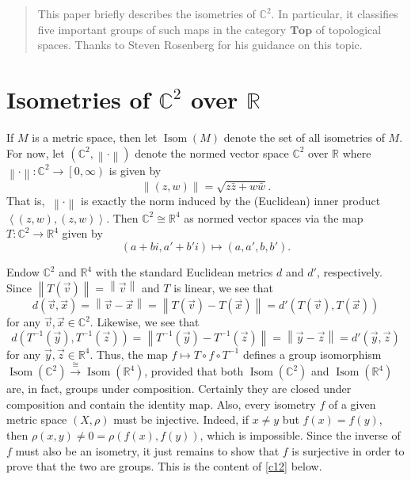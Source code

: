 \documentclass[10pt,letterpaper,cm]{nupset}
\theoremstyle{definition}
\theoremstyle{theorem}
\theoremstyle{remark}
\newcommand{\C}{\mathbb C}
\newcommand{\R}{\mathbb R}
\newcommand{\1}{\mathbf{1}}
\renewcommand{\v}{\vec v}
\newcommand{\x}{\vec x}
\newcommand{\y}{\vec y}
\newcommand{\z}{\vec z}
\newcommand{\0}{\vec {0}}
\DeclareMathOperator{\Isom}{Isom}
\begin{document}
\begin{abstract}
This paper briefly describes the isometries of $\C^2$. In particular, it classifies five important groups of such maps in the category $\mathbf{Top}$ of topological spaces. Thanks to Steven Rosenberg for his guidance on this topic.
\end{abstract}

\smallskip

\section{Isometries of $\C^2$ over $\R$}

If $M$ is a metric space, then let $\Isom(M)$ denote the set of all isometries of $M$. For now, let $\left(\C^2,  \left\lVert{\cdot}\right\rVert\right)$ denote the normed vector space $\C^2$ over $\R$ where $ \left\lVert{\cdot}\right\rVert : \C^2\to \left[0,\infty\right)$ is given by  $$ \left\lVert{(z,w)}\right\rVert=\sqrt{z\bar{z}+w\bar{w}}.$$ That is, $\ \left\lVert{\cdot}\right\rVert$ is exactly the norm induced by the (Euclidean) inner product $\left\langle (z,w), (z,w) \right\rangle$. Then $\C^2\cong \R^4$ as normed vector spaces via the map $T: \C^2 \to \R^4$ given by 
\[ \label{eqn:T}
\left(a+bi, a'+b'i\right)\mapsto \left(a,a',b,b'\right)
\tag{$\ast$}.\] 


	Endow $\C^2$ and $\R^4$ with the standard Euclidean metrics $d$ and $d'$, respectively. Since $ \left\lVert{T(\v)}\right\rVert= \left\lVert{\v}\right\rVert$ and $T$ is linear, we see that $$d(\v, \x)= \left\lVert{\v-\x}\right\rVert= \left\lVert{T(\v) -T(\x)}\right\rVert=d'(T(\v), T(\x))$$ for any $\v, \x \in \C^2.$ Likewise, we see that $$d(T^{-1}(\y), T^{-1}(\z))= \left\lVert{T^{-1}(\y)-T^{-1}(\z)}\right\rVert= \left\lVert{\y-\z}\right\rVert=d'(\y,\z)$$ for any $\y, \z \in \R^4$.
Thus, the map $f\mapsto T\circ f \circ T^{-1}$ defines a group isomorphism $\Isom(\C^2) \overset{\cong}{\longrightarrow} \Isom(\R^4)$, provided that both $\Isom(\C^2)$ and $\Isom(\R^4)$ are, in fact, groups under composition. Certainly they are closed under composition and contain the identity map. Also, every isometry $f$ of a given metric space $\left(X, \rho\right)$ must be injective. Indeed, if $x\ne y$ but $f(x)=f(y)$, then $\rho(x,y)\ne 0 = \rho(f(x),f(y))$, which is impossible. Since the inverse of $f$ must also be an isometry, it just remains to show that $f$ is surjective in order to prove that the two are groups. This is the content of \cref{c12} below. 

\medskip
\end{document}
